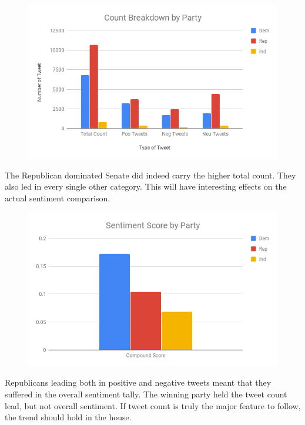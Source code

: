 \documentclass[11pt, twoside, reqno]{book}
\begin{document}
\begin{figure}[H]
\centering
	\includegraphics[scale=0.5]{count_party_senate}	
\end{figure}

The Republican dominated Senate did indeed carry the higher total count. They also led in every single other category. This will have interesting effects on the actual sentiment comparison.

\begin{figure}[H]
\centering
	\includegraphics[scale=0.5]{party_sent}
\end{figure}

Republicans leading both in positive and negative tweets meant that they suffered in the overall sentiment tally. The winning party held the tweet count lead, but not overall sentiment. If tweet count is truly the major feature to follow, the trend should hold in the house.
\end{document}

